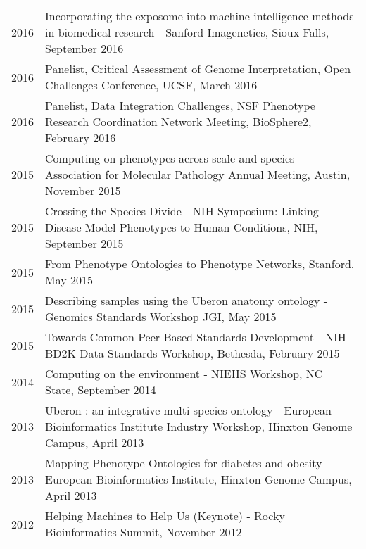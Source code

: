 \documentclass[11pt,fullpage]{article}
\begin{document}
\begin{longtable}{p{0.5in}|p{5.5in}}


 2016 & Incorporating the exposome into machine intelligence methods
 in biomedical research - Sanford Imagenetics, Sioux Falls, September 2016\\ 
  
 2016 & Panelist, Critical Assessment of Genome Interpretation, Open Challenges Conference, UCSF, March 2016\\ 

 2016 & Panelist, Data Integration Challenges, NSF Phenotype Research Coordination Network Meeting, BioSphere2, February 2016\\ 
 
 2015 & Computing on phenotypes across scale and species - Association for Molecular Pathology Annual Meeting,
  Austin, November 2015\\ 

 2015 & Crossing the Species Divide - NIH Symposium: Linking Disease Model Phenotypes to Human Conditions, 
  NIH, September 2015\\

 2015 & From Phenotype Ontologies to Phenotype Networks, 
  Stanford, May 2015\\

 2015 & Describing samples using the Uberon anatomy ontology - Genomics Standards Workshop
  JGI, May 2015\\

 2015 & Towards Common Peer Based Standards Development  - NIH BD2K Data Standards Workshop, 
  Bethesda, February 2015\\

 2014 & Computing on the environment - NIEHS Workshop, 
 NC State, September 2014\\

 2013 & Uberon : an integrative multi-species ontology - European Bioinformatics Institute Industry Workshop, 
 Hinxton Genome Campus, April 2013\\

 2013 & Mapping Phenotype Ontologies for diabetes and obesity - European Bioinformatics Institute, 
 Hinxton Genome Campus, April 2013\\

 2012 & Helping Machines to Help Us (Keynote) - Rocky Bioinformatics
 Summit, November 2012\\


\end{longtable}
\end{document}
